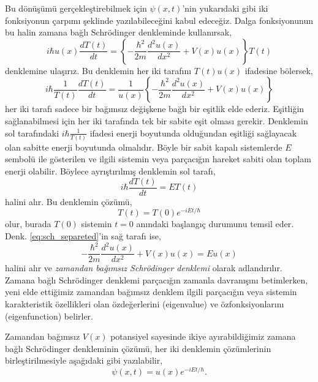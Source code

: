\documentclass[a4paper,12pt, twoside]{article}
\begin{document}
Bu dönüşümü gerçekleştirebilmek için $\psi ( x , t )$'nin yukarıdaki gibi iki fonksiyonun çarpımı şeklinde yazılabileceğini kabul edeceğiz. Dalga fonksiyonunun bu halin zamana bağlı Schrödinger denkleminde kullanırsak,
\begin{equation*}
i \hbar u ( x ) \frac { d T ( t ) } { d t } = \left\{ - \frac { \hbar ^ { 2 } } { 2 m } \frac { d ^ { 2 } u ( x ) } { d x ^ { 2 } } + V ( x ) u ( x ) \right\} T ( t )
\end{equation*}
denklemine ulaşırız. Bu denklemin her iki tarafını $T ( t ) u ( x )$ ifadesine bölersek,
\begin{equation}
i \hbar \frac { 1 } { T ( t ) } \frac { d T ( t ) } { d t } = \frac { 1 } { u ( x ) } \left\{ - \frac { \hbar ^ { 2 } } { 2 m } \frac { d ^ { 2 } u ( x ) } { d x ^ { 2 } } + V ( x ) u ( x ) \right\}
\label{eq:sch_separeted}
\end{equation}
her iki tarafı sadece bir bağımsız değişkene bağlı bir eşitlik elde ederiz. Eşitliğin sağlanabilmesi için her iki tarafında tek bir sabite eşit olması gerekir. Denklemin sol tarafındaki $i \hbar \frac { 1 } { T ( t ) }$ ifadesi enerji boyutunda olduğundan eşitliği sağlayacak olan sabitte enerji boyutunda olmalıdır. Böyle bir sabit kapalı sistemlerde $E$ sembolü ile gösterilen ve ilgili sistemin veya parçacığın hareket sabiti olan toplam enerji olabilir. Böylece ayrıştırılmış denklemin sol tarafı,
\begin{equation}
i \hbar \frac { d T ( t ) } { d t } = E T ( t )
\end{equation}
halini alır. Bu denklemin çözümü,
\begin{equation}
T ( t ) = T(0) e ^ { - i E t / \hbar }
\end{equation}
olur, burada $T(0)$ sistemin $t=0$ anındaki başlangıç durumunu temsil eder. Denk. \ref{eq:sch_separeted}'in sağ tarafı ise,
\begin{equation}
- \frac { \hbar ^ { 2 } } { 2 m } \frac { d ^ { 2 } u ( x ) } { d x ^ { 2 } } + V ( x ) u ( x ) = E u ( x )
\label{eq:time_independent_sch_eq}
\end{equation}
halini alır ve \emph{zamandan bağımsız Schrödinger denklemi} olarak adlandırılır. Zamana bağlı Schrödinger denklemi parçacığın zamanla davranışını betimlerken, yeni elde ettiğimiz zamandan bağımsız denklem ilgili parçacığın veya sistemin karakteristik özellikleri olan özdeğerlerini (eigenvalue) ve özfonksiyonlarını (eigenfunction) belirler.

Zamandan bağımsız $V(x)$ potansiyel sayesinde ikiye ayırabildiğimiz zamana bağlı Schrödinger denkleminin çözümü, her iki denklemin çözümlerinin birleştirilmesiyle aşağıdaki gibi yazılabilir,
\begin{equation}
\psi(x,t) = u(x) e ^ { - i E t / \hbar }.
\end{equation}
\end{document}
